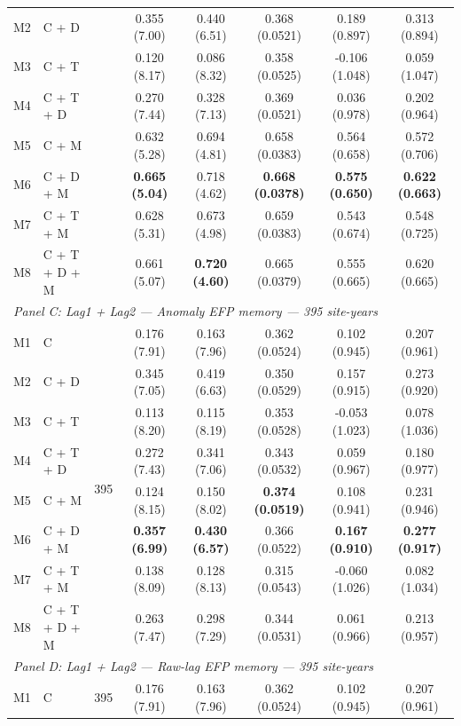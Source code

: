 \begin{table}[htbp]
\begin{tabular}{llcccccc}
M2 & C + D &  & 0.355 (7.00) & 0.440 (6.51) & 0.368 (0.0521) & 0.189 (0.897) & 0.313 (0.894) \\
M3 & C + T &  & 0.120 (8.17) & 0.086 (8.32) & 0.358 (0.0525) & -0.106 (1.048) & 0.059 (1.047) \\
M4 & C + T + D &  & 0.270 (7.44) & 0.328 (7.13) & 0.369 (0.0521) & 0.036 (0.978) & 0.202 (0.964) \\
M5 & C + M &  & 0.632 (5.28) & 0.694 (4.81) & 0.658 (0.0383) & 0.564 (0.658) & 0.572 (0.706) \\
M6 & C + D + M &  & \textbf{0.665 (5.04)} & 0.718 (4.62) & \textbf{0.668 (0.0378)} & \textbf{0.575 (0.650)} & \textbf{0.622 (0.663)} \\
M7 & C + T + M &  & 0.628 (5.31) & 0.673 (4.98) & 0.659 (0.0383) & 0.543 (0.674) & 0.548 (0.725) \\
M8 & C + T + D + M &  & 0.661 (5.07) & \textbf{0.720 (4.60)} & 0.665 (0.0379) & 0.555 (0.665) & 0.620 (0.665) \\
\midrule
\multicolumn{8}{l}{\textit{Panel C: Lag1 + Lag2 --- Anomaly EFP memory --- 395 site-years}} \\
\midrule
M1 & C & \multirow{8}{*}{395} & 0.176 (7.91) & 0.163 (7.96) & 0.362 (0.0524) & 0.102 (0.945) & 0.207 (0.961) \\
M2 & C + D &  & 0.345 (7.05) & 0.419 (6.63) & 0.350 (0.0529) & 0.157 (0.915) & 0.273 (0.920) \\
M3 & C + T &  & 0.113 (8.20) & 0.115 (8.19) & 0.353 (0.0528) & -0.053 (1.023) & 0.078 (1.036) \\
M4 & C + T + D &  & 0.272 (7.43) & 0.341 (7.06) & 0.343 (0.0532) & 0.059 (0.967) & 0.180 (0.977) \\
M5 & C + M &  & 0.124 (8.15) & 0.150 (8.02) & \textbf{0.374 (0.0519)} & 0.108 (0.941) & 0.231 (0.946) \\
M6 & C + D + M &  & \textbf{0.357 (6.99)} & \textbf{0.430 (6.57)} & 0.366 (0.0522) & \textbf{0.167 (0.910)} & \textbf{0.277 (0.917)} \\
M7 & C + T + M &  & 0.138 (8.09) & 0.128 (8.13) & 0.315 (0.0543) & -0.060 (1.026) & 0.082 (1.034) \\
M8 & C + T + D + M &  & 0.263 (7.47) & 0.298 (7.29) & 0.344 (0.0531) & 0.061 (0.966) & 0.213 (0.957) \\
\midrule
\multicolumn{8}{l}{\textit{Panel D: Lag1 + Lag2 --- Raw-lag EFP memory --- 395 site-years}} \\
\midrule
M1 & C & \multirow{8}{*}{395} & 0.176 (7.91) & 0.163 (7.96) & 0.362 (0.0524) & 0.102 (0.945) & 0.207 (0.961) \\

\end{tabular}
\end{table}
